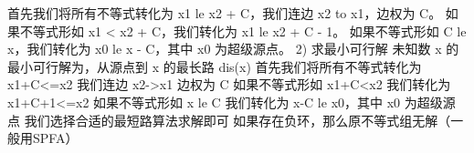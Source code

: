 {}首先我们将所有不等式转化为 \markdownRendererDollarSign{}x\markdownRendererUnderscore{}1 \markdownRendererBackslash{}le x\markdownRendererUnderscore{}2 + C\markdownRendererDollarSign{}，我们连边 \markdownRendererDollarSign{}x\markdownRendererUnderscore{}2 \markdownRendererBackslash{}to x\markdownRendererUnderscore{}1\markdownRendererDollarSign{}，边权为 \markdownRendererDollarSign{}C\markdownRendererDollarSign{}。\markdownRendererHardLineBreak
{}如果不等式形如 \markdownRendererDollarSign{}x\markdownRendererUnderscore{}1 < x\markdownRendererUnderscore{}2 + C\markdownRendererDollarSign{}，我们转化为 \markdownRendererDollarSign{}x\markdownRendererUnderscore{}1 \markdownRendererBackslash{}le x\markdownRendererUnderscore{}2 + C - 1\markdownRendererDollarSign{}。\markdownRendererHardLineBreak
{}如果不等式形如 \markdownRendererDollarSign{}C \markdownRendererBackslash{}le x\markdownRendererDollarSign{}，我们转化为 \markdownRendererDollarSign{}x\markdownRendererUnderscore{}0 \markdownRendererBackslash{}le x - C\markdownRendererDollarSign{}，其中 \markdownRendererDollarSign{}x\markdownRendererUnderscore{}0\markdownRendererDollarSign{} 为超级源点。\markdownRendererParagraphSeparator
{}\markdownRendererDollarSign{} 2) \markdownRendererDollarSign{}求最小可行解\markdownRendererParagraphSeparator
{}未知数\markdownRendererDollarSign{} x \markdownRendererDollarSign{}的最小可行解为，从源点到\markdownRendererDollarSign{} x \markdownRendererDollarSign{}的最长路\markdownRendererDollarSign{} dis(x) \markdownRendererDollarSign{}\markdownRendererParagraphSeparator
{}首先我们将所有不等式转化为\markdownRendererDollarSign{} x1+C<=x2 \markdownRendererDollarSign{} 我们连边\markdownRendererDollarSign{} x2->x1 \markdownRendererDollarSign{} 边权为\markdownRendererDollarSign{} C \markdownRendererDollarSign{}\markdownRendererParagraphSeparator
{}如果不等式形如\markdownRendererDollarSign{} x1+C<x2 \markdownRendererDollarSign{} 我们转化为\markdownRendererDollarSign{} x1+C+1<=x2 \markdownRendererDollarSign{}\markdownRendererParagraphSeparator
{}如果不等式形如 \markdownRendererDollarSign{}x \markdownRendererBackslash{}le C\markdownRendererDollarSign{} 我们转化为 \markdownRendererDollarSign{}x-C \markdownRendererBackslash{}le x\markdownRendererUnderscore{}0\markdownRendererDollarSign{}，其中 \markdownRendererDollarSign{}x\markdownRendererUnderscore{}0\markdownRendererDollarSign{} 为超级源点\markdownRendererParagraphSeparator
{}我们选择合适的最短路算法求解即可 如果存在负环，那么原不等式组无解（一般用SPFA）\markdownRendererInterblockSeparator
{}
\markdownRendererSectionEnd \markdownRendererSectionBegin
